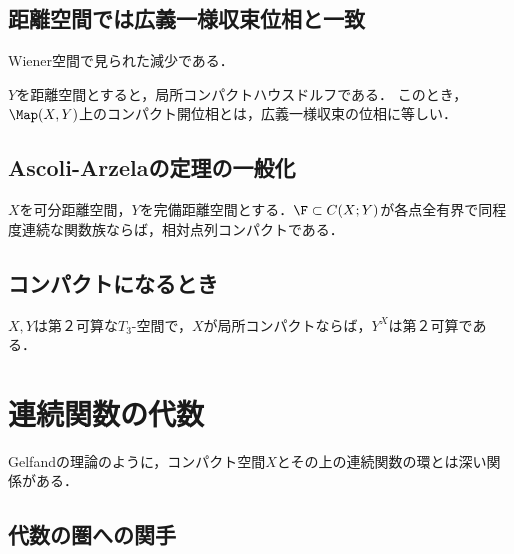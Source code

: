 \documentclass[uplatex,dvipdfmx]{jsreport}
\begin{document}
\subsection{距離空間では広義一様収束位相と一致}

\begin{tcolorbox}[colframe=ForestGreen, colback=ForestGreen!10!white,breakable,colbacktitle=ForestGreen!40!white,coltitle=black,fonttitle=\bfseries\sffamily,
title=]
    Wiener空間で見られた減少である．
\end{tcolorbox}

\begin{proposition}
    $Y$を距離空間とすると，局所コンパクトハウスドルフである．
    このとき，$\Map(X,Y)$上のコンパクト開位相とは，広義一様収束の位相に等しい．
\end{proposition}

\subsection{Ascoli-Arzelaの定理の一般化}

\begin{theorem}
    $X$を可分距離空間，$Y$を完備距離空間とする．$\F\subset C(X;Y)$が各点全有界で同程度連続な関数族ならば，相対点列コンパクトである．
\end{theorem}

\subsection{コンパクトになるとき}

\begin{proposition}
    $X,Y$は第２可算な$T_3$-空間で，$X$が局所コンパクトならば，$Y^X$は第２可算である．
\end{proposition}

\section{連続関数の代数}

\begin{tcolorbox}[colframe=ForestGreen, colback=ForestGreen!10!white,breakable,colbacktitle=ForestGreen!40!white,coltitle=black,fonttitle=\bfseries\sffamily,
title=]
    Gelfandの理論のように，コンパクト空間$X$とその上の連続関数の環とは深い関係がある．
\end{tcolorbox}

\subsection{代数の圏への関手}
\end{document}
